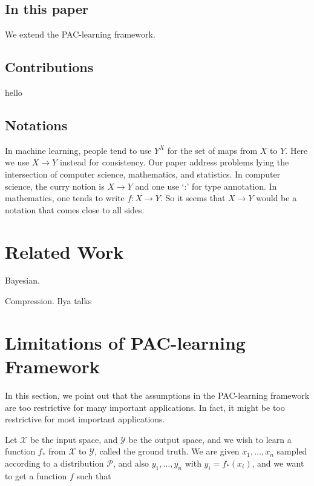 \documentclass[11pt, oneside]{article}   	%
\theoremstyle{definition}
\begin{document}
\subsection{In this paper}
We extend the PAC-learning framework.

\subsection{Contributions}
hello

\subsection{Notations}

In machine learning, people tend to use $Y^X$ for the set of maps from $X$ to $Y$. Here we use $X \to Y$ instead for consistency. Our paper address problems lying the intersection of computer science, mathematics, and statistics. In computer science, the curry notion is $X\to Y$ and one use `:' for type annotation. In mathematics, one tends to write $f: X \to Y$. So it seems that $X\to Y$ would be a notation that comes close to all sides.

\section{Related Work}

Bayesian.

Compression. Ilya talks 

\section{Limitations of PAC-learning Framework}

In this section, we point out that the assumptions in the PAC-learning framework are too restrictive for many important applications. In fact, it might be too restrictive for most important applications.

\newcommand{\Input}{\mathcal{X}}
\newcommand{\Output}{\mathcal{Y}}
\newcommand{\InputDistribution}{\mathcal{P}}
\newcommand{\Expect}{\limits(\mathbb{E})}
\newcommand{\ExpectInput}[1]{\mathbb{E}_{#1 \sim \InputDistribution}}
\newcommand{\HypothesisClass}{\mathcal{H}}
\newcommand{\LearningAlgorithm}{\mathcal{A}}
\newcommand{\deformableTemplate}{\phi}
\newcommand{\DeformationSpace}{\Gamma}
\newcommand{\argmax}{\mathop{\operatorname{argmax}}}

Let $\Input$ be the input space, and $\Output$ be the output space, and we wish to learn a function $f_*$ from $\Input$ to $\Output$, called the ground truth. We are given $x_1, \dots, x_n$ sampled according to a distribution $\InputDistribution$, and also $y_1, \dots, y_n$ with $y_i=f_*(x_i)$, and we want to get a function $f$ such that
\end{document}
